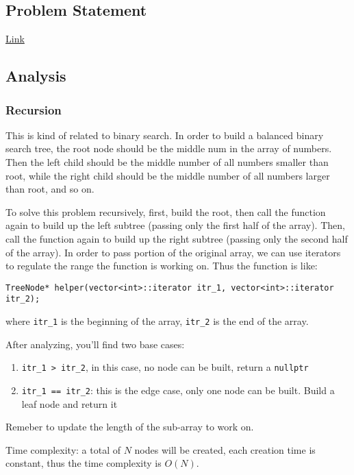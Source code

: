 \documentclass[11pt]{article}
\begin{document}
\subsection{Problem Statement}
\label{sec:orgf55d74e}
\href{https://leetcode.com/problems/convert-sorted-array-to-binary-search-tree/}{Link}
\subsection{Analysis}
\label{sec:org415f5fe}
\subsubsection{Recursion}
\label{sec:org4c20e60}
This is kind of related to binary search. In order to build a balanced binary search tree, the root node should be the middle num in the array of numbers. Then the left child should be the middle number of all numbers smaller than root, while the right child should be the middle number of all numbers larger than root, and so on.

To solve this problem recursively, first, build the root, then call the function again to build up the left subtree (passing only the first half of the array). Then, call the function again to build up the right subtree (passing only the second half of the array). In order to pass portion of the original array, we can use iterators to regulate the range the function is working on. Thus the function is like:
\begin{verbatim}
TreeNode* helper(vector<int>::iterator itr_1, vector<int>::iterator itr_2);
\end{verbatim}
where \texttt{itr\_1} is the beginning of the array, \texttt{itr\_2} is the end of the array.

After analyzing, you'll find two base cases:
\begin{enumerate}
\item \texttt{itr\_1 > itr\_2}, in this case, no node can be built, return a \texttt{nullptr}
\item \texttt{itr\_1 == itr\_2}: this is the edge case, only one node can be built. Build a leaf node and return it
\end{enumerate}

Remeber to update the length of the sub-array to work on.

Time complexity: a total of \(N\) nodes will be created, each creation time is constant, thus the time complexity is \(O(N)\).
\end{document}

